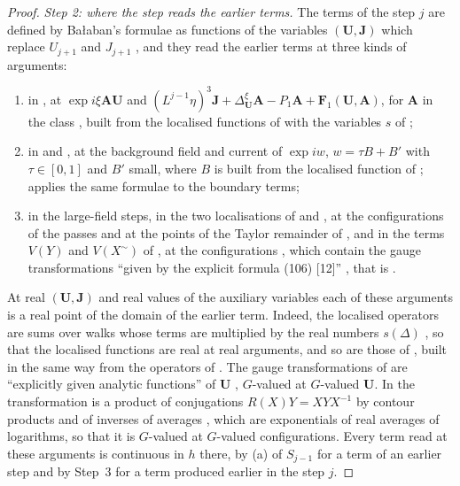 \documentclass[11pt]{preprint}
\numberwithin{equation}{section}
\theoremstyle{definition}
\theoremstyle{remark}
\theoremstyle{plain}
\begin{document}
\begin{proof}
\emph{Step 2: where the step reads the earlier terms.} The terms of the step $j$ are defined by Ba{\l}aban's formulae as functions of the variables $(\mathbf U, \mathbf J)$ which replace $U_{j+1}$ and $J_{j+1}$ \cite[p.~272]{BalabanRG1}, and they read the earlier terms at three kinds of arguments:
\begin{enumerate}[label=(\roman*)]
\item in \cite[(3.13), p.~272]{BalabanRG1}, at $\exp i\xi\mathbf A\mathbf U$ and $(L^{j-1}\eta)^3\mathbf J + \Delta^\xi_{\mathbf U}\mathbf A - P_1\mathbf A + \mathbf F_1(\mathbf U, \mathbf A)$, for $\mathbf A$ in the class \cite[(3.14)]{BalabanRG1}, built from the localised functions of \cite[p.~273]{BalabanRG1} with the variables $s$ of \cite[p.~8]{BalabanRG2};
\item in \cite[(3.33)--(3.36), p.~277]{BalabanRG1} and \cite[(3.53), p.~280]{BalabanRG1}, at the background field and current of $\exp iw$, $w = \tau B + B'$ with $\tau \in [0, 1]$ and $B'$ small, where $B$ is built from the localised function of \cite[(1.8), p.~3]{BalabanRG2}; \cite[p.~276]{BalabanCRE} applies the same formulae to the boundary terms;
\item in the large-field steps, in the two localisations of \cite[(1.59)--(1.60), p.~372]{BalabanLFR2} and \cite[pp.~373--379]{BalabanLFR2}, at the configurations of the passes and at the points of the Taylor remainder of \cite[(3.34)]{BalabanRG1}, and in the terms $V(Y)$ and $V(X^\sim)$ of \cite[(1.70)--(1.72), pp.~377--379]{BalabanLFR2}, at the configurations \cite[(1.61)--(1.65), pp.~373--375]{BalabanLFR2}, which contain the gauge transformations ``given by the explicit formula (106) [12]'' \cite[p.~373]{BalabanLFR2}, that is \cite[(106), p.~33]{BalabanAVG}.
\end{enumerate}
At real $(\mathbf U, \mathbf J)$ and real values of the auxiliary variables each of these arguments is a real point of the domain of the earlier term. Indeed, the localised operators are sums over walks whose terms are multiplied by the real numbers $s(\Delta)$ \cite[p.~3]{BalabanRG2}, so that the localised functions are real at real arguments, and so are those of \cite[(1.54), (1.57), (1.58), pp.~370--371]{BalabanLFR2}, built in the same way from the operators of \cite{BalabanPBG,BalabanVAR}. The gauge transformations of \cite[(3.26)--(3.27), p.~275]{BalabanRG1} are ``explicitly given analytic functions'' of $\mathbf U$ \cite[p.~276]{BalabanRG1}, $G$-valued at $G$-valued $\mathbf U$. In \cite[(106), p.~33]{BalabanAVG} the transformation is a product of conjugations $R(X)Y = XYX^{-1}$ \cite[(56), p.~27]{BalabanAVG} by contour products and of inverses of averages \cite[(105)]{BalabanAVG}, which are exponentials of real averages of logarithms, so that it is $G$-valued at $G$-valued configurations. Every term read at these arguments is continuous in $h$ there, by (a) of $S_{j-1}$ for a term of an earlier step and by Step~3 for a term produced earlier in the step $j$.


\end{proof}
\end{document}
